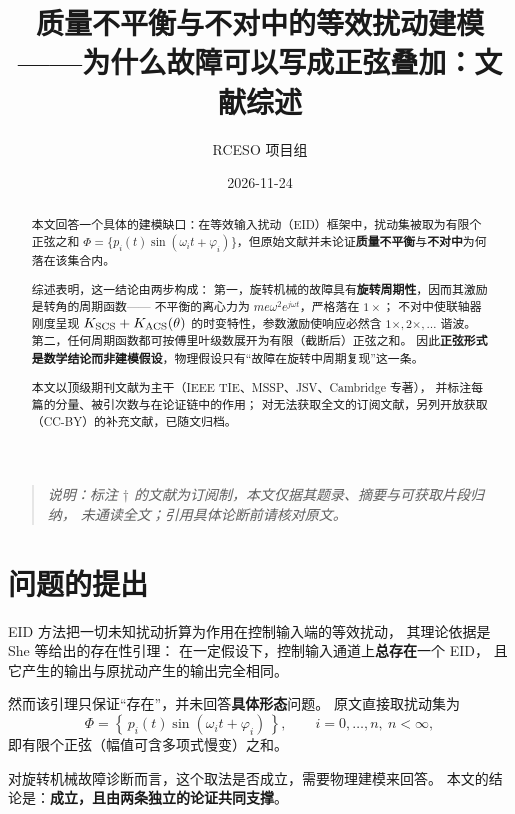 \documentclass[11pt,a4paper]{ctexart}
\title{\bfseries 质量不平衡与不对中的等效扰动建模\\[2mm]
\large ——为什么故障可以写成正弦叠加：文献综述}
\author{RCESO 项目组}
\date{2026-11-24}
\begin{document}
\maketitle

\begin{abstract}
\noindent
本文回答一个具体的建模缺口：在等效输入扰动（EID）框架中，扰动集被取为有限个正弦之和
$\Phi=\{p_i(t)\sin(\omega_i t+\varphi_i)\}$，但原始文献并未论证\textbf{质量不平衡}与\textbf{不对中}为何落在该集合内。

综述表明，这一结论由两步构成：
第一，旋转机械的故障具有\textbf{旋转周期性}，因而其激励是转角的周期函数——
不平衡的离心力为 $me\omega^2e^{j\omega t}$，严格落在 $1\times$；
不对中使联轴器刚度呈现 $K_{\rm SCS}+K_{\rm ACS}(\theta)$ 的时变特性，参数激励使响应必然含 $1\times,2\times,\dots$ 谐波。
第二，任何周期函数都可按傅里叶级数展开为有限（截断后）正弦之和。
因此\textbf{正弦形式是数学结论而非建模假设}，物理假设只有“故障在旋转中周期复现”这一条。

本文以顶级期刊文献为主干（IEEE TIE、MSSP、JSV、Cambridge 专著），
并标注每篇的分量、被引次数与在论证链中的作用；
对无法获取全文的订阅文献，另列开放获取（CC-BY）的补充文献，已随文归档。
\end{abstract}

\begin{quote}
\small\itshape
说明：标注 \(\dagger\) 的文献为订阅制，本文仅据其题录、摘要与可获取片段归纳，
未通读全文；引用具体论断前请核对原文。
\end{quote}

\tableofcontents
\newpage

\section{问题的提出}

EID 方法把一切未知扰动折算为作用在控制输入端的等效扰动，
其理论依据是 She 等给出的存在性引理：
在一定假设下，控制输入通道上\textbf{总存在}一个 EID，
且它产生的输出与原扰动产生的输出完全相同。

然而该引理只保证“存在”，并未回答\textbf{具体形态}问题。
原文直接取扰动集为
\begin{equation}
\Phi=\left\{\,p_i(t)\sin(\omega_i t+\varphi_i)\,\right\},\qquad i=0,\dots,n,\ n<\infty,
\end{equation}
即有限个正弦（幅值可含多项式慢变）之和。

对旋转机械故障诊断而言，这个取法是否成立，需要物理建模来回答。
本文的结论是：\textbf{成立，且由两条独立的论证共同支撑}。
\end{document}
